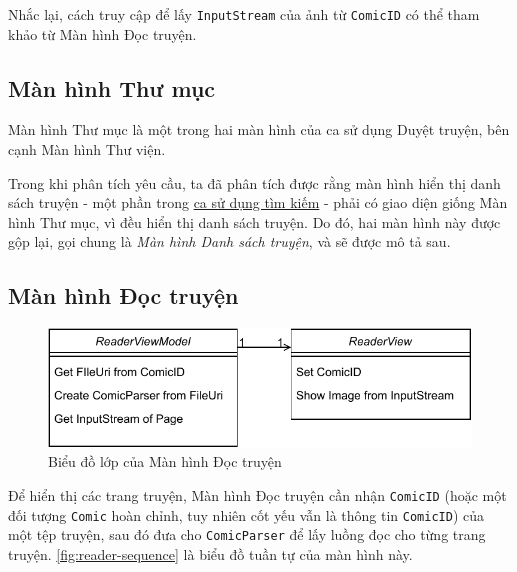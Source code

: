 \documentclass[../../../../thesis]{subfiles}
\begin{document}
Nhắc lại, cách truy cập để lấy \texttt{InputStream} của ảnh từ \texttt{ComicID}
có thể tham khảo từ Màn hình Đọc truyện.



\subsection{Màn hình Thư mục}\label{sec:folder-design}

Màn hình Thư mục là một trong hai màn hình của ca sử dụng Duyệt truyện, bên cạnh
Màn hình Thư viện.

Trong khi phân tích yêu cầu, ta đã phân tích được rằng màn hình hiển thị danh
sách truyện - một phần trong \hyperref[sec:search-comic]{ca sử dụng tìm kiếm} -
phải có giao diện giống Màn hình Thư mục, vì đều hiển thị danh sách truyện. Do
đó, hai màn hình này được gộp lại, gọi chung là \emph{Màn hình Danh sách
truyện}, và sẽ được mô tả sau.



\subsection{Màn hình Đọc truyện}\label{sec:reader-design}

\begin{figure}
    \centering
    \includegraphics[scale=0.85]{../images/reader_mvvm_class.pdf}
    \caption{Biểu đồ lớp của Màn hình Đọc truyện}
    \label{fig:reader_mvvm_class}
\end{figure}

Để hiển thị các trang truyện, Màn hình Đọc truyện cần nhận \texttt{ComicID}
(hoặc một đối tượng \texttt{Comic} hoàn chỉnh, tuy nhiên cốt yếu vẫn là thông
tin \texttt{ComicID}) của một tệp truyện, sau đó đưa cho \texttt{ComicParser} để
lấy luồng đọc cho từng trang truyện. \autoref{fig:reader-sequence} là biểu đồ
tuần tự của màn hình này.
\end{document}
